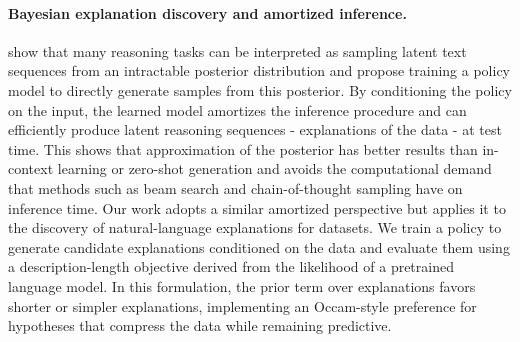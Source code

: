 \documentclass{article}
\theoremstyle{plain}
\theoremstyle{definition}
\theoremstyle{remark}
\begin{document}
\paragraph{Bayesian explanation discovery and amortized inference.}
\citet{hu2024-amortizingintractableinferencelarge} show that many reasoning tasks can be interpreted as sampling latent text sequences from an intractable posterior distribution and propose training a policy model to directly generate samples from this posterior. 
By conditioning the policy on the input, the learned model amortizes the inference procedure and can efficiently produce latent reasoning sequences - explanations of the data -  at test time. This shows that approximation of the posterior has better results than in-context learning or zero-shot generation and avoids the computational demand that methods such as beam search and chain-of-thought sampling have on inference time.
Our work adopts a similar amortized perspective but applies it to the discovery of natural-language explanations for datasets.
We train a policy to generate candidate explanations conditioned on the data and evaluate them using a description-length objective derived from the likelihood of a pretrained language model.
In this formulation, the prior term over explanations favors shorter or simpler explanations, implementing an Occam-style preference for hypotheses that compress the data while remaining predictive.



 

\end{document}
